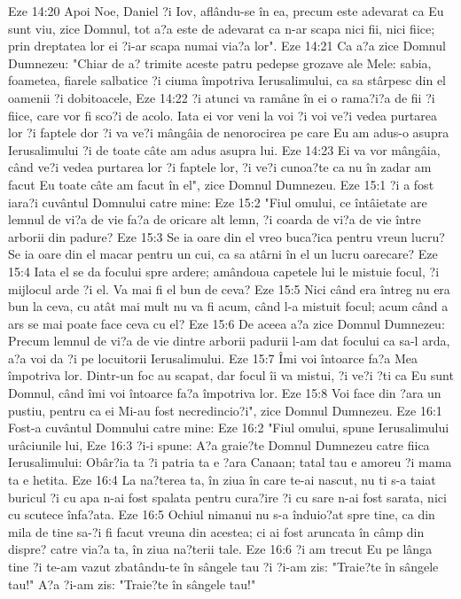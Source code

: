 Eze 14:20  Apoi Noe, Daniel ?i Iov, aflându-se în ea, precum este adevarat ca Eu sunt viu, zice Domnul, tot a?a este de adevarat ca n-ar scapa nici fii, nici fiice; prin dreptatea lor ei ?i-ar scapa numai via?a lor".
Eze 14:21  Ca a?a zice Domnul Dumnezeu: "Chiar de a? trimite aceste patru pedepse grozave ale Mele: sabia, foametea, fiarele salbatice ?i ciuma împotriva Ierusalimului, ca sa stârpesc din el oamenii ?i dobitoacele,
Eze 14:22  ?i atunci va ramâne în ei o rama?i?a de fii ?i fiice, care vor fi sco?i de acolo. Iata ei vor veni la voi ?i voi ve?i vedea purtarea lor ?i faptele dor ?i va ve?i mângâia de nenorocirea pe care Eu am adus-o asupra Ierusalimului ?i de toate câte am adus asupra lui.
Eze 14:23  Ei va vor mângâia, când ve?i vedea purtarea lor ?i faptele lor, ?i ve?i cunoa?te ca nu în zadar am facut Eu toate câte am facut în el", zice Domnul Dumnezeu.
Eze 15:1  ?i a fost iara?i cuvântul Domnului catre mine:
Eze 15:2  "Fiul omului, ce întâietate are lemnul de vi?a de vie fa?a de oricare alt lemn, ?i coarda de vi?a de vie între arborii din padure?
Eze 15:3  Se ia oare din el vreo buca?ica pentru vreun lucru? Se ia oare din el macar pentru un cui, ca sa atârni în el un lucru oarecare?
Eze 15:4  Iata el se da focului spre ardere; amândoua capetele lui le mistuie focul, ?i mijlocul arde ?i el. Va mai fi el bun de ceva?
Eze 15:5  Nici când era întreg nu era bun la ceva, cu atât mai mult nu va fi acum, când l-a mistuit focul; acum când a ars se mai poate face ceva cu el?
Eze 15:6  De aceea a?a zice Domnul Dumnezeu: Precum lemnul de vi?a de vie dintre arborii padurii l-am dat focului ca sa-l arda, a?a voi da ?i pe locuitorii Ierusalimului.
Eze 15:7  Îmi voi întoarce fa?a Mea împotriva lor. Dintr-un foc au scapat, dar focul îi va mistui, ?i ve?i ?ti ca Eu sunt Domnul, când îmi voi întoarce fa?a împotriva lor.
Eze 15:8  Voi face din ?ara un pustiu, pentru ca ei Mi-au fost necredincio?i", zice Domnul Dumnezeu.
Eze 16:1  Fost-a cuvântul Domnului catre mine:
Eze 16:2  "Fiul omului, spune Ierusalimului urâciunile lui,
Eze 16:3  ?i-i spune: A?a graie?te Domnul Dumnezeu catre fiica Ierusalimului: Obâr?ia ta ?i patria ta e ?ara Canaan; tatal tau e amoreu ?i mama ta e hetita.
Eze 16:4  La na?terea ta, în ziua în care te-ai nascut, nu ti s-a taiat buricul ?i cu apa n-ai fost spalata pentru cura?ire ?i cu sare n-ai fost sarata, nici cu scutece înfa?ata.
Eze 16:5  Ochiul nimanui nu s-a înduio?at spre tine, ca din mila de tine sa-?i fi facut vreuna din acestea; ci ai fost aruncata în câmp din dispre? catre via?a ta, în ziua na?terii tale.
Eze 16:6  ?i am trecut Eu pe lânga tine ?i te-am vazut zbatându-te în sângele tau ?i ?i-am zis: "Traie?te în sângele tau!" A?a ?i-am zis: "Traie?te în sângele tau!"
